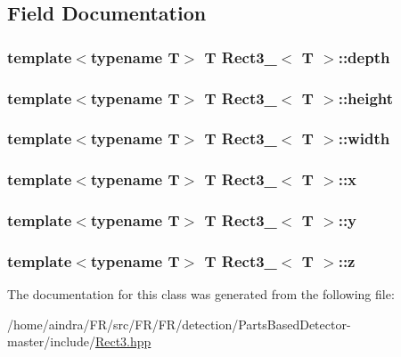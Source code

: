 \subsection{\-Field \-Documentation}
\hypertarget{classRect3___a73850e016f7e8152e47d430239c47cc2}{
\subsubsection[{depth}]{\setlength{\rightskip}{0pt plus 5cm}template$<$typename \-T$>$ \-T {\bf \-Rect3\-\_\-}$<$ \-T $>$\-::{\bf depth}}}\label{classRect3___a73850e016f7e8152e47d430239c47cc2}
\hypertarget{classRect3___a4f10fdcf15fe8cdb6b01a9b90d56ebe5}{
\subsubsection[{height}]{\setlength{\rightskip}{0pt plus 5cm}template$<$typename \-T$>$ \-T {\bf \-Rect3\-\_\-}$<$ \-T $>$\-::{\bf height}}}\label{classRect3___a4f10fdcf15fe8cdb6b01a9b90d56ebe5}
\hypertarget{classRect3___a780cbb24a81d6bbfff26c2ac6660beb8}{
\subsubsection[{width}]{\setlength{\rightskip}{0pt plus 5cm}template$<$typename \-T$>$ \-T {\bf \-Rect3\-\_\-}$<$ \-T $>$\-::{\bf width}}}\label{classRect3___a780cbb24a81d6bbfff26c2ac6660beb8}
\hypertarget{classRect3___a035f211c0c365a9dbd15436cb5448e31}{
\subsubsection[{x}]{\setlength{\rightskip}{0pt plus 5cm}template$<$typename \-T$>$ \-T {\bf \-Rect3\-\_\-}$<$ \-T $>$\-::{\bf x}}}\label{classRect3___a035f211c0c365a9dbd15436cb5448e31}
\hypertarget{classRect3___ab2c61e4e318bc064eb8bb707b699cbb6}{
\subsubsection[{y}]{\setlength{\rightskip}{0pt plus 5cm}template$<$typename \-T$>$ \-T {\bf \-Rect3\-\_\-}$<$ \-T $>$\-::{\bf y}}}\label{classRect3___ab2c61e4e318bc064eb8bb707b699cbb6}
\hypertarget{classRect3___a99bae7d4f2bf0af6a3ffbfb0fa752b9e}{
\subsubsection[{z}]{\setlength{\rightskip}{0pt plus 5cm}template$<$typename \-T$>$ \-T {\bf \-Rect3\-\_\-}$<$ \-T $>$\-::{\bf z}}}\label{classRect3___a99bae7d4f2bf0af6a3ffbfb0fa752b9e}


\-The documentation for this class was generated from the following file\-:\begin{DoxyCompactItemize}
\item 
/home/aindra/\-F\-R/src/\-F\-R/\-F\-R/detection/\-Parts\-Based\-Detector-\/master/include/\hyperlink{Rect3_8hpp}{\-Rect3.\-hpp}\end{DoxyCompactItemize}
